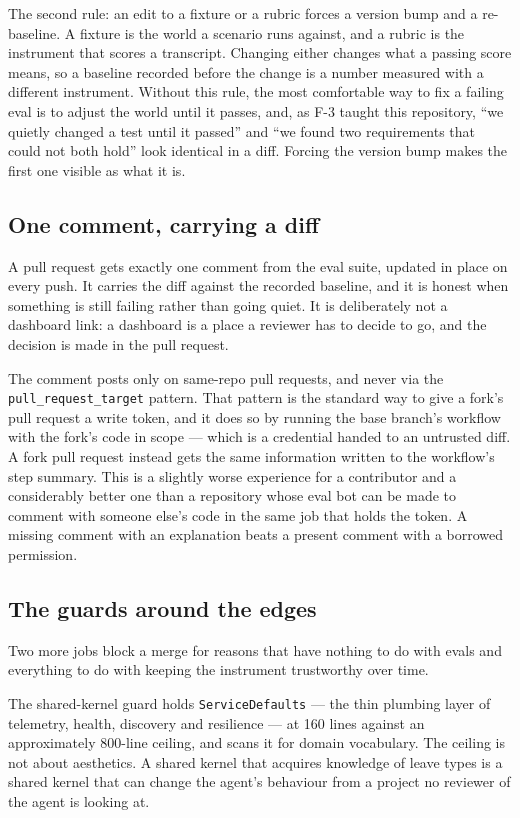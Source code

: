 \documentclass[11pt,a4paper]{article}
\begin{document}
The second rule: an edit to a fixture or a rubric forces a version bump and a re-baseline. A fixture is the world a scenario runs against, and a rubric is the instrument that scores a transcript. Changing either changes what a passing score means, so a baseline recorded before the change is a number measured with a different instrument. Without this rule, the most comfortable way to fix a failing eval is to adjust the world until it passes, and, as F-3 taught this repository, ``we quietly changed a test until it passed'' and ``we found two requirements that could not both hold'' look identical in a diff. Forcing the version bump makes the first one visible as what it is.

\subsection{One comment, carrying a diff}

A pull request gets exactly one comment from the eval suite, updated in place on every push. It carries the diff against the recorded baseline, and it is honest when something is still failing rather than going quiet. It is deliberately not a dashboard link: a dashboard is a place a reviewer has to decide to go, and the decision is made in the pull request.

The comment posts only on same-repo pull requests, and never via the \texttt{pull\_request\_target} pattern. That pattern is the standard way to give a fork's pull request a write token, and it does so by running the base branch's workflow with the fork's code in scope --- which is a credential handed to an untrusted diff. A fork pull request instead gets the same information written to the workflow's step summary. This is a slightly worse experience for a contributor and a considerably better one than a repository whose eval bot can be made to comment with someone else's code in the same job that holds the token. A missing comment with an explanation beats a present comment with a borrowed permission.

\subsection{The guards around the edges}

Two more jobs block a merge for reasons that have nothing to do with evals and everything to do with keeping the instrument trustworthy over time.

The shared-kernel guard holds \texttt{ServiceDefaults} --- the thin plumbing layer of telemetry, health, discovery and resilience --- at 160 lines against an approximately 800-line ceiling, and scans it for domain vocabulary. The ceiling is not about aesthetics. A shared kernel that acquires knowledge of leave types is a shared kernel that can change the agent's behaviour from a project no reviewer of the agent is looking at.
\end{document}
